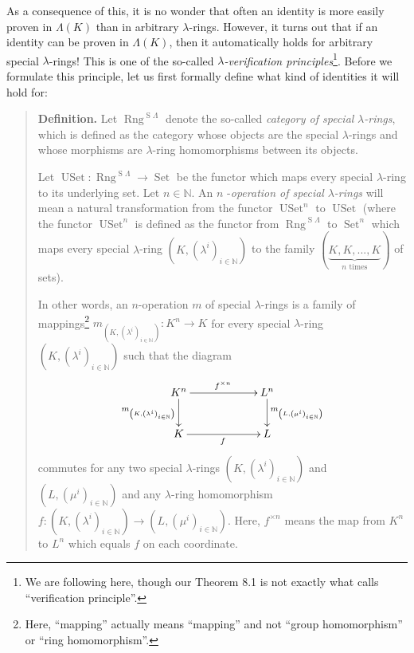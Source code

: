 \documentclass[numbers=enddot,12pt,final,onecolumn,notitlepage]{scrartcl}%
\begin{document}
As a consequence of this, it is no wonder that often an identity is more
easily proven in $\Lambda\left(  K\right)  $ than in arbitrary $\lambda
$-rings. However, it turns out that if an identity can be proven in
$\Lambda\left(  K\right)  $, then it automatically holds for arbitrary special
$\lambda$-rings! This is one of the so-called $\lambda$\textit{-verification
principles}\footnote{We are following \cite[pp. 25--27]{Knut73} here, though
our Theorem 8.1 is not exactly what \cite{Knut73} calls ``verification
principle''.}. Before we formulate this principle, let us first formally
define what kind of identities it will hold for:

\begin{quote}
\textbf{Definition.} Let $\operatorname*{Rng}^{\operatorname*{S}\Lambda}$
denote the so-called \textit{category of special }$\lambda$\textit{-rings},
which is defined as the category whose objects are the special $\lambda$-rings
and whose morphisms are $\lambda$-ring homomorphisms between its objects.

Let $\operatorname*{USet}:\operatorname*{Rng}^{\operatorname*{S}\Lambda
}\rightarrow\operatorname*{Set}$ be the functor which maps every special
$\lambda$-ring to its underlying set. Let $n\in\mathbb{N}$. An $n$%
-\textit{operation of special }$\lambda$\textit{-rings} will mean a natural
transformation from the functor $\operatorname*{USet}^{n}$ to
$\operatorname*{USet}$ (where the functor $\operatorname*{USet}^{n}$ is
defined as the functor from $\operatorname*{Rng}^{\operatorname*{S}\Lambda}$
to $\operatorname*{Set}^{n}$ which maps every special $\lambda$-ring $\left(
K,\left(  \lambda^{i}\right)  _{i\in\mathbb{N}}\right)  $ to the family
$\left(  \underbrace{K,K,...,K}_{n\text{ times}}\right)  $ of sets).

In other words, an $n$-operation $m$ of special $\lambda$-rings is a family of
mappings\footnote{Here, ``mapping'' actually means ``mapping'' and not ``group
homomorphism'' or ``ring homomorphism''.} $m_{\left(  K,\left(  \lambda
^{i}\right)  _{i\in\mathbb{N}}\right)  }:K^{n}\rightarrow K$ for every special
$\lambda$-ring $\left(  K,\left(  \lambda^{i}\right)  _{i\in\mathbb{N}%
}\right)  $ such that the diagram%
\begin{equation}
\xymatrixcolsep{5pc}\xymatrix{ K^n \ar[r]^{f^{\times n}} \ar[d]_{m_{\left(K,\left(\lambda^i\right)_{i\in\mathbb{N}}\right)}} & L^n \ar[d]^{m_{\left(L,\left(\mu^i\right)_{i\in\mathbb{N}}\right)}} \\ K \ar[r]_f & L }
\label{I-oper}%
\end{equation}
commutes for any two special $\lambda$-rings $\left(  K,\left(  \lambda
^{i}\right)  _{i\in\mathbb{N}}\right)  $ and $\left(  L,\left(  \mu
^{i}\right)  _{i\in\mathbb{N}}\right)  $ and any $\lambda$-ring homomorphism
$f:\left(  K,\left(  \lambda^{i}\right)  _{i\in\mathbb{N}}\right)
\rightarrow\left(  L,\left(  \mu^{i}\right)  _{i\in\mathbb{N}}\right)  $.
Here, $f^{\times n}$ means the map from $K^{n}$ to $L^{n}$ which equals $f$ on
each coordinate.
\end{quote}
\end{document}

